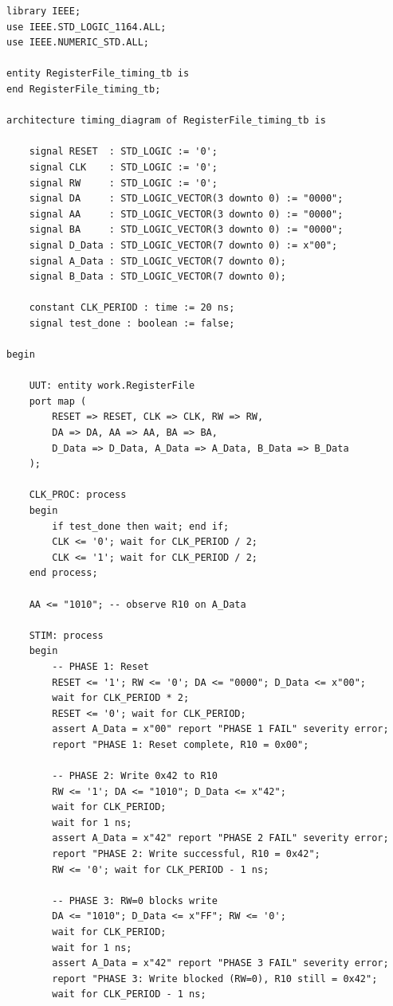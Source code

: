 \documentclass{article}
\begin{document}
\begin{lstlisting}[style=vhdl, caption={RegisterFile\_timing\_tb.vhd}, label={lst:timing-tb}]
library IEEE;
use IEEE.STD_LOGIC_1164.ALL;
use IEEE.NUMERIC_STD.ALL;

entity RegisterFile_timing_tb is
end RegisterFile_timing_tb;

architecture timing_diagram of RegisterFile_timing_tb is

    signal RESET  : STD_LOGIC := '0';
    signal CLK    : STD_LOGIC := '0';
    signal RW     : STD_LOGIC := '0';
    signal DA     : STD_LOGIC_VECTOR(3 downto 0) := "0000";
    signal AA     : STD_LOGIC_VECTOR(3 downto 0) := "0000";
    signal BA     : STD_LOGIC_VECTOR(3 downto 0) := "0000";
    signal D_Data : STD_LOGIC_VECTOR(7 downto 0) := x"00";
    signal A_Data : STD_LOGIC_VECTOR(7 downto 0);
    signal B_Data : STD_LOGIC_VECTOR(7 downto 0);

    constant CLK_PERIOD : time := 20 ns;
    signal test_done : boolean := false;

begin

    UUT: entity work.RegisterFile
    port map (
        RESET => RESET, CLK => CLK, RW => RW,
        DA => DA, AA => AA, BA => BA,
        D_Data => D_Data, A_Data => A_Data, B_Data => B_Data
    );

    CLK_PROC: process
    begin
        if test_done then wait; end if;
        CLK <= '0'; wait for CLK_PERIOD / 2;
        CLK <= '1'; wait for CLK_PERIOD / 2;
    end process;

    AA <= "1010"; -- observe R10 on A_Data

    STIM: process
    begin
        -- PHASE 1: Reset
        RESET <= '1'; RW <= '0'; DA <= "0000"; D_Data <= x"00";
        wait for CLK_PERIOD * 2;
        RESET <= '0'; wait for CLK_PERIOD;
        assert A_Data = x"00" report "PHASE 1 FAIL" severity error;
        report "PHASE 1: Reset complete, R10 = 0x00";

        -- PHASE 2: Write 0x42 to R10
        RW <= '1'; DA <= "1010"; D_Data <= x"42";
        wait for CLK_PERIOD;
        wait for 1 ns;
        assert A_Data = x"42" report "PHASE 2 FAIL" severity error;
        report "PHASE 2: Write successful, R10 = 0x42";
        RW <= '0'; wait for CLK_PERIOD - 1 ns;

        -- PHASE 3: RW=0 blocks write
        DA <= "1010"; D_Data <= x"FF"; RW <= '0';
        wait for CLK_PERIOD;
        wait for 1 ns;
        assert A_Data = x"42" report "PHASE 3 FAIL" severity error;
        report "PHASE 3: Write blocked (RW=0), R10 still = 0x42";
        wait for CLK_PERIOD - 1 ns;


\end{lstlisting}
\end{document}
